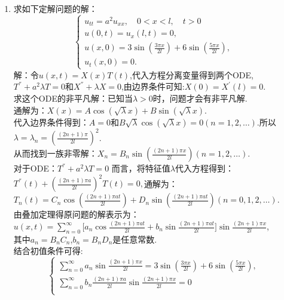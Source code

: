 \documentclass[11pt]{article}
\begin{document}
\begin{enumerate}
    \item 求如下定解问题的解：
    \begin{equation*}
            \left\{
             \begin{array}{lr}
             u_{tt}=a^2u_{xx},\quad 0<x<l,\quad t>0 &  \\
             u(0,t)=u_x(l,t)=0, & \\
             u(x,0)=3\sin(\frac{3\pi x}{2l})+6\sin(\frac{5\pi x}{2l}), &    \\
             u_t(x,0)=0. &
             \end{array}
            \right.
            \end{equation*}
    解：令$u(x,t)=X(x)T(t)$,代入方程分离变量得到两个ODE,\\$T^{''}+a^{2}\lambda T=0$和$X^{''}+\lambda X=0$,由边界条件可知:$X(0)=X^{'}(l)=0$.\\求这个ODE的非平凡解：已知当$\lambda>0$时，问题才会有非平凡解.\\通解为：$X(x)=A\cos(\sqrt {\lambda }x)+B\sin(\sqrt {\lambda}x)$.\\代入边界条件得到：$A=0$和$B\sqrt {\lambda}\cos(\sqrt {\lambda}x)=0(n=1,2,\dots)$.所以$\lambda = \lambda_n=(\frac{(2n+1)\pi}{2l})^2$.\\从而找到一族非零解：$X_n=B_n\sin(\frac{(2n+1)\pi x}{2l})(n=1,2,\dots)$.
    \\ 对于ODE：$T^{''}+a^{2}\lambda T=0$ 而言，将特征值$\lambda$代入方程得到：\\$T^{''}(t)+(\frac{(2n+1)\pi a}{2l})^{2}T(t)=0,$通解为：$T_n(t)=C_n\cos(\frac{(2n+1)\pi at}{2l})+D_n\sin(\frac{(2n+1)\pi at}{2l})(n=0,1,2,\dots)$.\\由叠加定理得原问题的解表示为：$u(x,t)=\sum_{n=0}^{\infty}\big[a_n\cos\frac{(2n+1)\pi at}{2l}+b_n\sin\frac{(2n+1)\pi at}{2l}]\sin\frac{(2n+1)\pi x}{2l}$,\\其中$a_n=B_{n}C_n$,\quad $b_n=B_nD_n$是任意常数.\\结合初值条件可得:
    \begin{equation*}
            \left\{
             \begin{array}{lr}
             \sum_{n=0}^{\infty}a_n\sin\frac{(2n+1)\pi x}{2l}=3\sin(\frac{3\pi x}{2l})+6\sin(\frac{5\pi x}{2l}), &  \\
             \sum_{n=0}^{\infty}b_n\frac{(2n+1)\pi a}{2l}\sin\frac{(2n+1)\pi x}{2l}=0 & \\
             \end{array}
            \right.
            \end{equation*}

\end{enumerate}
\end{document}
